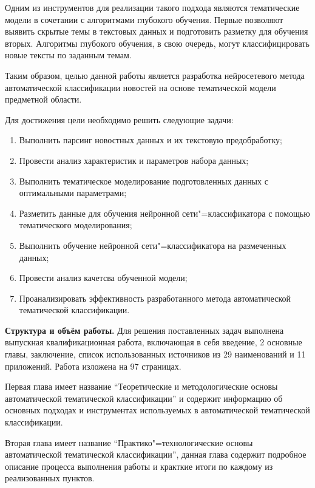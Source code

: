 \documentclass[autoref]{SCWorks}
\begin{document}
Одним из инструментов для реализации такого подхода являются тематические
модели в сочетании с алгоритмами глубокого обучения. Первые позволяют выявить
скрытые темы в текстовых данных и подготовить разметку для обучения вторых.
Алгоритмы глубокого обучения, в свою очередь, могут классифицировать новые
тексты по заданным темам.

Таким образом, целью данной работы является разработка нейросетевого метода
автоматической классификации новостей на основе тематической модели предметной
области.

Для достижения цели необходимо решить следующие задачи:
\begin{enumerate}
    \item Выполнить парсинг новостных данных и их текстовую предобработку;
    \item Провести анализ характеристик и параметров набора данных;
    \item Выполнить тематическое моделирование подготовленных данных с
    оптимальными параметрами;
    \item Разметить данные для обучения нейронной сети"=классификатора с
    помощью тематического моделирования;
    \item Выполнить обучение нейронной сети"=классификатора на размеченных
    данных;
    \item Провести анализ качетсва обученной модели;
    \item Проанализировать эффективность разработанного метода автоматической
    тематической классификации.
\end{enumerate}

\textbf{Структура и объём работы.}
Для решения поставленных задач выполнена выпускная квалификационная работа,
включающая в себя введение, 2 основные главы, заключение, список использованных
источников из 29 наименований и 11 приложений. Работа изложена на 97
страницах.

Первая глава имеет название \enquote{Теоретические и методологические основы
автоматической тематической классификации} и содержит информацию об основных
подходах и инструментах используемых в автоматической тематической
классификации.

Вторая глава имеет название \enquote{Практико"=технологические основы
автоматической тематической классификации}, данная глава содержит подробное
описание процесса выполнения работы и кракткие итоги по каждому из
реализованных пунктов.
\end{document}
